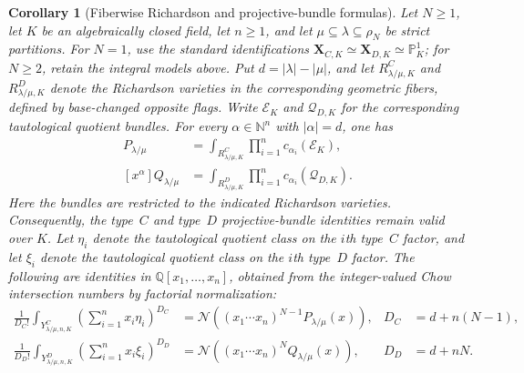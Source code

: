 \documentclass[11pt,a4paper,oneside]{amsart}
\numberwithin{equation}{section}
\newtheorem{corollary}[theorem]{Corollary}
\theoremstyle{definition}
\theoremstyle{remark}
\newcommand{\cN}{\mathcal N}
\begin{document}
\begin{corollary}[Fiberwise Richardson and projective-bundle formulas]
\label{appA:cor:fiberwise-formulas}
Let $N\geq1$, let $K$ be an algebraically closed field, let $n\geq1$, and
let $\mu\subseteq\lambda\subseteq\rho_N$ be strict partitions.  For $N=1$,
use the standard identifications
$\mathbf X_{C,K}\simeq\mathbf X_{D,K}\simeq\mathbb P^1_K$; for $N\geq2$,
retain the integral models above.  Put $d=|\lambda|-|\mu|$, and let
$R^C_{\lambda/\mu,K}$ and $R^D_{\lambda/\mu,K}$ denote the Richardson
varieties in the corresponding geometric fibers, defined by base-changed
opposite flags.  Write $\mathcal E_K$ and $\mathcal Q_{D,K}$ for the
corresponding tautological quotient bundles.  For every
$\alpha\in\mathbb N^n$ with $|\alpha|=d$, one has
\begin{align}
 [x^\alpha]P_{\lambda/\mu}
 &=\int_{R^C_{\lambda/\mu,K}}
   \prod_{i=1}^n c_{\alpha_i}(\mathcal E_K),
 \label{appA:eq:fiberwise-C-coeff}\\
 [x^\alpha]Q_{\lambda/\mu}
 &=\int_{R^D_{\lambda/\mu,K}}
   \prod_{i=1}^n c_{\alpha_i}(\mathcal Q_{D,K}).
 \label{appA:eq:fiberwise-D-coeff}
\end{align}
Here the bundles are restricted to the indicated Richardson varieties.
Consequently, the type~$C$ and type~$D$ projective-bundle identities remain
valid over $K$.  Let $\eta_i$ denote the tautological quotient class on the
$i$th type~$C$ factor, and let $\xi_i$ denote the tautological quotient
class on the $i$th type~$D$ factor.  The following are identities in
$\mathbb Q[x_1,\ldots,x_n]$, obtained from the integer-valued Chow
intersection numbers by factorial normalization:
\begin{align}
 \frac{1}{D_C!}\int_{Y^C_{\lambda/\mu,n,K}}
 \left(\sum_{i=1}^n x_i\eta_i\right)^{D_C}
 &=\cN\!\left((x_1\cdots x_n)^{N-1}P_{\lambda/\mu}(x)\right),
 &D_C&=d+n(N-1),
 \label{appA:eq:fiberwise-C-projective}\\
 \frac{1}{D_D!}\int_{Y^D_{\lambda/\mu,n,K}}
 \left(\sum_{i=1}^n x_i\xi_i\right)^{D_D}
 &=\cN\!\left((x_1\cdots x_n)^NQ_{\lambda/\mu}(x)\right),
 &D_D&=d+nN.
 \label{appA:eq:fiberwise-D-projective}
\end{align}
\end{corollary}
\end{document}
